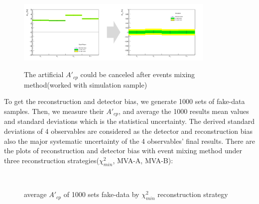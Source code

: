 		\begin{figure}[H]
		\centering{}
	    	\includegraphics[width=0.85\textwidth]{Figures/Asym/artificial/a05_artificial_to_mix_fixed.pdf}\\
		\caption{The artificial $A'_{cp}$ could be canceled after events mixing method(worked with simulation sample)}
		\label{AsymBias:fig:washout_artificial}
		\end{figure}
		\FloatBarrier

		To get the reconstruction and detector bias, we generate 1000 sets of fake-data samples. Then, we measure their $A'_{cp}$, and average the 1000 results mean values and standard deviations which is the statistical uncertainty. The derived standard deviations of 4 observables are considered as the detector and reconstruction bias also the major systematic uncertainty of the 4 observables' final results. There are the plots of reconstruction and detector bias with event mixing method under three reconstruction strategies($\chi^2_{min}$, MVA-A, MVA-B):

		\begin{figure}[H]
			\centering
				\\
		\caption{average $A'_{cp}$ of 1000 sets fake-data by $\chi^2_{min}$ reconstruction strategy}
		\label{AsymBias:fig:chi2_DetBias}
		\end{figure}
		\FloatBarrier

